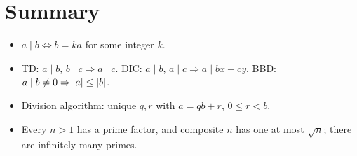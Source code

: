 \section{Summary}
\begin{itemize}
  \item $a \mid b \iff b = ka$ for some integer $k$.
  \item TD: $a\mid b$, $b \mid c \Rightarrow a \mid c$. DIC: $a \mid b$, $a \mid c \Rightarrow
        a \mid bx + cy$. BBD: $a\mid b \neq 0 \Rightarrow \left\lvert a \right\rvert \le \left\lvert b \right\rvert$.
  \item Division algorithm: unique $q, r$ with $a = qb + r$, $0 \le r < b$.
  \item Every $n > 1$ has a prime factor, and composite $n$ has one at most $\sqrt n$;
        there are infinitely many primes.
\end{itemize}
